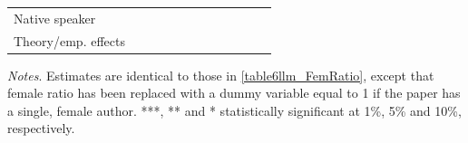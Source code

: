 \begin{table}
\begin{threeparttable}
\begin{tabular}{p{3cm}S@{}S@{}S@{}S@{}S@{}S@{}S@{}S@{}S@{}S@{}S@{}}
            Native speaker                &               &           {}   &               &           {}   &               &           {}   &               &           {}   &               &               &               \\
            Theory/emp. effects           &               &           {}   &               &           {}   &               &           {}   &               &           {}   &               &               &               \\
            \bottomrule
        \end{tabular}
        \begin{tablenotes}
            \tiny
            \item \textit{Notes}. Estimates are identical to those in \autoref{table6llm_FemRatio}, except that female ratio has been replaced with a dummy variable equal to 1 if the paper has a single, female author. ***, ** and * statistically significant at 1\%, 5\% and 10\%, respectively.
        \end{tablenotes}
    \end{threeparttable}

\end{table}

